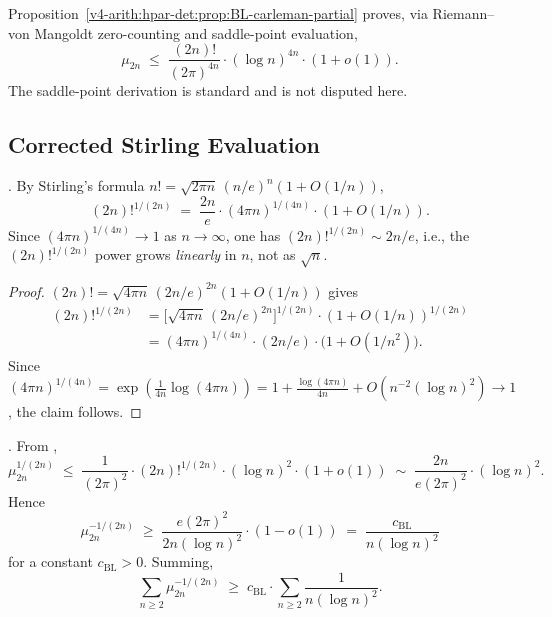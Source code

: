 Proposition~\ref{v4-arith:hpar-det:prop:BL-carleman-partial} proves,
via Riemann--von Mangoldt zero-counting and saddle-point evaluation,
\begin{equation}
\label{v4-arith:r-audit:eq:upper-bound}
\mu_{2n}\;\leq\;\frac{(2n)!}{(2\pi)^{4n}}\cdot(\log n)^{4n}\cdot(1+o(1)).
\end{equation}
The saddle-point derivation is standard and is not disputed here.

\subsection{Corrected Stirling Evaluation}
\label{v4-arith:r-audit:corrected-stirling}

\begin{lemma}
\label{v4-arith:r-audit:lem:stirling}
\ClaimStatusProvedHere. By Stirling's formula
\(n!=\sqrt{2\pi n}\,(n/e)^{n}(1+O(1/n))\),
\begin{equation}
(2n)!^{1/(2n)}\;=\;\frac{2n}{e}\cdot(4\pi n)^{1/(4n)}\cdot(1+O(1/n)).
\end{equation}
Since \((4\pi n)^{1/(4n)}\to 1\) as \(n\to\infty\), one has
\((2n)!^{1/(2n)}\sim 2n/e\), i.e., the \((2n)!^{1/(2n)}\) power
grows \emph{linearly} in \(n\), not as \(\sqrt{n}\).
\end{lemma}

\begin{proof}
\((2n)!=\sqrt{4\pi n}\,(2n/e)^{2n}(1+O(1/n))\) gives
\begin{align*}
(2n)!^{1/(2n)}
&=\bigl[\sqrt{4\pi n}\,(2n/e)^{2n}\bigr]^{1/(2n)}\cdot(1+O(1/n))^{1/(2n)}\\
&=(4\pi n)^{1/(4n)}\cdot(2n/e)\cdot\bigl(1+O(1/n^{2})\bigr).
\end{align*}
Since \((4\pi n)^{1/(4n)}=\exp(\tfrac{1}{4n}\log(4\pi n))
=1+\tfrac{\log(4\pi n)}{4n}+O(n^{-2}(\log n)^{2})\to 1\), the claim
follows.
\end{proof}

\begin{proposition}
\label{v4-arith:r-audit:prop:BL-carleman-corrected}
\ClaimStatusProvedHere. From
,
\begin{equation}
\label{v4-arith:r-audit:eq:mu-power}
\mu_{2n}^{1/(2n)}\;\leq\;
\frac{1}{(2\pi)^{2}}\cdot(2n)!^{1/(2n)}\cdot(\log n)^{2}\cdot(1+o(1))
\;\sim\;\frac{2n}{e(2\pi)^{2}}\cdot(\log n)^{2}.
\end{equation}
Hence
\begin{equation}
\label{v4-arith:r-audit:eq:mu-inverse-lower}
\mu_{2n}^{-1/(2n)}\;\geq\;
\frac{e(2\pi)^{2}}{2n(\log n)^{2}}\cdot(1-o(1))
\;=\;\frac{c_{\mathrm{BL}}}{n(\log n)^{2}}
\end{equation}
for a constant \(c_{\mathrm{BL}}>0\). Summing,
\begin{equation}
\label{v4-arith:r-audit:eq:carleman-bound}
\sum_{n\geq 2}\mu_{2n}^{-1/(2n)}\;\geq\;
c_{\mathrm{BL}}\cdot\sum_{n\geq 2}\frac{1}{n(\log n)^{2}}.
\end{equation}
\end{proposition}

